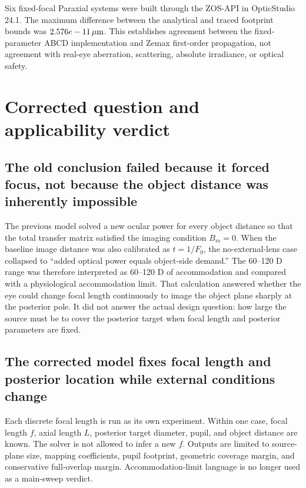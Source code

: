 \documentclass[11pt,openany]{report}
\newcommand{\um}{\,\mu\mathrm{m}}
\newcommand{\keyresult}[1]{\textcolor{ReportBlue}{\textbf{#1}}}
\begin{document}
Six fixed-focal Paraxial systems were built through the ZOS-API in OpticStudio 24.1. The maximum difference between the analytical and traced footprint bounds was \keyresult{$\ZosMaxError\um$}. This establishes agreement between the fixed-parameter ABCD implementation and Zemax first-order propagation, not agreement with real-eye aberration, scattering, absolute irradiance, or optical safety.

\tableofcontents
\clearpage
{}

\chapter{Corrected question and applicability verdict}

\section{The old conclusion failed because it forced focus, not because the object distance was inherently impossible}
The previous model solved a new ocular power for every object distance so that the total transfer matrix satisfied the imaging condition $B_m=0$. When the baseline image distance was also calibrated as $t=1/F_0$, the no-external-lens case collapsed to ``added optical power equals object-side demand.'' The 60--120 D range was therefore interpreted as 60--120 D of accommodation and compared with a physiological accommodation limit. That calculation answered whether the eye could change focal length continuously to image the object plane sharply at the posterior pole. It did not answer the actual design question: how large the source must be to cover the posterior target when focal length and posterior parameters are fixed.

\section{The corrected model fixes focal length and posterior location while external conditions change}
Each discrete focal length is run as its own experiment. Within one case, focal length $f$, axial length $L$, posterior target diameter, pupil, and object distance are known. The solver is not allowed to infer a new $f$. Outputs are limited to source-plane size, mapping coefficients, pupil footprint, geometric coverage margin, and conservative full-overlap margin. Accommodation-limit language is no longer used as a main-sweep verdict.
\end{document}
